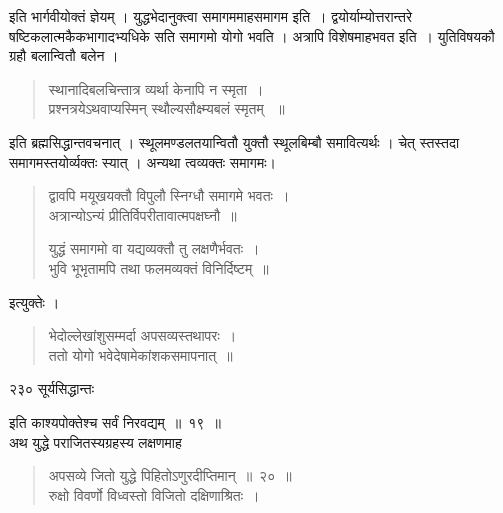 \documentclass[11pt, openany]{book}
\begin{document}
\noindent इति भार्गवीयोक्तं ज्ञेयम् । युद्धभेदानुक्त्वा समागममाह\textendash समागम इति~। द्वयोर्याम्योत्तरान्तरे षष्टिकलात्मकैकभागादभ्यधिके सति समागमो योगो भवति । अत्रापि विशेषमाह\textendash भवत इति~। युतिविषयकौ ग्रहौ बलान्वितौ बलेन ।


\begin{quote}
{\qt स्थानादिबलचिन्तात्र व्यर्था केनापि न स्मृता~।\\
प्रश्नत्रयेऽथवाप्यस्मिन् स्थौल्यसौक्ष्म्यबलं स्मृतम् ~॥ }
\end{quote}


\noindent इति ब्रह्मसिद्धान्तवचनात् । स्थूलमण्डलतयान्वितौ युक्तौ स्थूलबिम्बौ समावित्यर्थः । चेत् स्तस्तदा समागमस्तयोर्व्यक्तः स्यात् । अन्यथा त्वव्यक्तः समागमः।


\begin{quote}
{\qt द्वावपि मयूखयक्तौ विपुलौ स्निग्धौ समागमे भवतः~।\\
अत्रान्योऽन्यं प्रीतिर्विपरीतावात्मपक्षघ्नौ~॥

युद्धं समागमो वा यद्यव्यक्तौ तु लक्षणैर्भवतः~।\\
भुवि भूभृतामपि तथा फलमव्यक्तं विनिर्दिष्टम्~॥ }
\end{quote}
\noindent इत्युक्तेः । 

\begin{quote}
{\qt भेदोल्लेखांशुसम्मर्दा अपसव्यस्तथापरः~। \\
 ततो योगो भवेदेषामेकांशकसमापनात्~॥}
\end{quote}
\newpage

\noindent २३० \hspace{4cm} सूर्यसिद्धान्तः 
\vspace{1cm}


\noindent इति काश्यपोक्तेश्च सर्वं निरवद्यम्~॥~१९~॥ \\
\noindent अथ युद्धे पराजितस्यग्रहस्य लक्षणमाह \textendash 

\begin{quote}
{\ssi अपसव्ये जितो युद्धे पिहितोऽणुरदीप्तिमान्~॥~२०~॥ \\
 
 रुक्षो विवर्णो विध्वस्तो विजितो दक्षिणाश्रितः~।} 
\end{quote}
\end{document}
